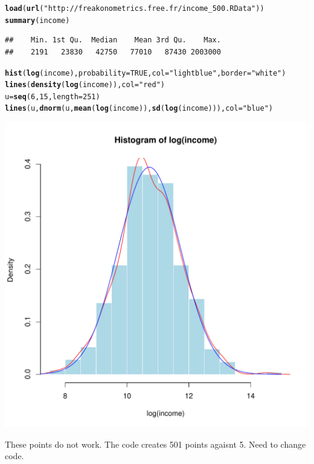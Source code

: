 \documentclass[12pt, a4paper, oneside]{article}\usepackage[]{graphicx}\usepackage[]{color}
\makeatletter
\def\maxwidth{ %
  \ifdim\Gin@nat@width>\linewidth
    \linewidth
  \else
    \Gin@nat@width
  \fi
}
\newcommand{\hlnum}[1]{\textcolor[rgb]{0.686,0.059,0.569}{#1}}%
\newcommand{\hlstr}[1]{\textcolor[rgb]{0.192,0.494,0.8}{#1}}%
\newcommand{\hlstd}[1]{\textcolor[rgb]{0.345,0.345,0.345}{#1}}%
\newcommand{\hlkwb}[1]{\textcolor[rgb]{0.69,0.353,0.396}{#1}}%
\newcommand{\hlkwc}[1]{\textcolor[rgb]{0.333,0.667,0.333}{#1}}%
\newcommand{\hlkwd}[1]{\textcolor[rgb]{0.737,0.353,0.396}{\textbf{#1}}}%
\newenvironment{kframe}{%
 \def\at@end@of@kframe{}%
 \ifinner\ifhmode%
  \def\at@end@of@kframe{\end{minipage}}%
  \begin{minipage}{\columnwidth}%
 \fi\fi%
 \def\FrameCommand##1{\hskip\@totalleftmargin \hskip-\fboxsep
 \colorbox{shadecolor}{##1}\hskip-\fboxsep
     \hskip-\linewidth \hskip-\@totalleftmargin \hskip\columnwidth}%
 \MakeFramed {\advance\hsize-\width
   \@totalleftmargin\z@ \linewidth\hsize
   \@setminipage}}%
 {\par\unskip\endMakeFramed%
 \at@end@of@kframe}
\newenvironment{knitrout}{}{} %
\makeatother
\begin{document}
\begin{knitrout}
\color{fgcolor}\begin{kframe}
\begin{alltt}
\hlkwd{load}\hlstd{(}\hlkwd{url}\hlstd{(}\hlstr{"http://freakonometrics.free.fr/income_500.RData"}\hlstd{))}
\hlkwd{summary}\hlstd{(income)}
\end{alltt}
\begin{verbatim}
##    Min. 1st Qu.  Median    Mean 3rd Qu.    Max. 
##    2191   23830   42750   77010   87430 2003000
\end{verbatim}
\begin{alltt}
\hlkwd{hist}\hlstd{(}\hlkwd{log}\hlstd{(income),}\hlkwc{probability}\hlstd{=}\hlnum{TRUE}\hlstd{,}\hlkwc{col}\hlstd{=}\hlstr{"light blue"}\hlstd{,}\hlkwc{border}\hlstd{=}\hlstr{"white"}\hlstd{)}
\hlkwd{lines}\hlstd{(}\hlkwd{density}\hlstd{(}\hlkwd{log}\hlstd{(income)),}\hlkwc{col}\hlstd{=}\hlstr{"red"}\hlstd{)}
\hlstd{u}\hlkwb{=}\hlkwd{seq}\hlstd{(}\hlnum{6}\hlstd{,}\hlnum{15}\hlstd{,}\hlkwc{length}\hlstd{=}\hlnum{251}\hlstd{)}
\hlkwd{lines}\hlstd{(u,}\hlkwd{dnorm}\hlstd{(u,}\hlkwd{mean}\hlstd{(}\hlkwd{log}\hlstd{(income)),}\hlkwd{sd}\hlstd{(}\hlkwd{log}\hlstd{(income))),}\hlkwc{col}\hlstd{=}\hlstr{"blue"}\hlstd{)}
\end{alltt}
\end{kframe}
\includegraphics[width=\maxwidth]{figure/da-1} 

\end{knitrout}
These points do not work. The code creates 501 points agaisnt 5. Need to change code.  
\end{document}
